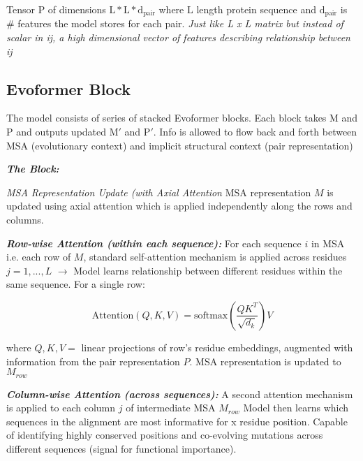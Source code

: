 \documentclass[../main.tex]{subfiles}
\begin{document}
Tensor $\mathrm{P}$ of dimensions $\mathrm{L} * \mathrm{L} * \mathrm{d_{pair}}$ where $\mathrm{L}$ length protein sequence and $\mathrm{d_{pair}}$ is $\#$ features the model stores for each pair. \textit{Just like L x L matrix but instead of scalar in ij, a high dimensional vector of features describing relationship between ij}


\subsection*{Evoformer Block}
The model consists of series of stacked Evoformer blocks. Each block takes $\mathrm{M}$ and $\mathrm{P}$ and outputs updated $\mathrm{M'}$ and $\mathrm{P'}$. Info is allowed to flow back and forth between MSA (evolutionary context) and implicit structural context (pair representation)

\vspace{0.3cm}

\textbf{\textit{\large{The Block:}}}

\vspace{0.3cm}

\textit{\large{MSA Representation Update (with Axial Attention}}
MSA representation $M$ is updated using axial attention which is applied independently along the rows and columns.

\vspace{0.3cm}

\textit{\textbf{Row-wise Attention (within each sequence):}} For each sequence $i$ in MSA i.e. each row of $M$, standard self-attention mechanism is applied across residues $j=1,...,L$ $\rightarrow$ Model learns relationship between different residues within the same sequence. For a single row: 

\begin{equation}
    \text{Attention}(Q, K, V) = \text{softmax}\left(\frac{Q K^T}{\sqrt{d_k}}\right) V
\end{equation}

where $Q,K,V =$ linear projections of row's residue embeddings, augmented with information from the pair representation $P$. MSA representation is updated to $M_{row}$ 

\vspace{0.3cm}

\textit{\textbf{Column-wise Attention (across sequences):}} A second attention mechanism is applied to each column $j$ of intermediate MSA $M_{row}$ Model then learns which sequences in the alignment are most informative for x residue position. Capable of identifying highly conserved positions and co-evolving mutations across different sequences (signal for functional importance).
\end{document}
